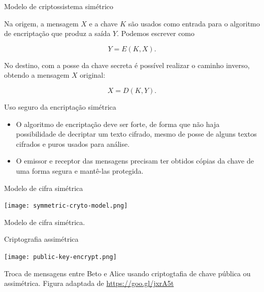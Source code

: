 \begin{frame}{Modelo de criptossistema simétrico}

Na origem, a mensagem $X$ e a chave $K$ são usados como entrada 
para o algoritmo de encriptação que produz a saída $Y$. Podemos 
escrever como

$$Y = E(K, X).$$

No destino, com a posse da chave secreta é possível realizar o caminho 
inverso, obtendo a mensagem $X$ original:

$$X = D(K ,Y).$$

\end{frame}


\begin{frame}{Uso seguro da encriptação simétrica}

\begin{itemize}
\item O algoritmo de encriptação deve ser forte, de forma que não haja
possibilidade de decriptar um texto cifrado, mesmo de posse de alguns
textos cifrados e puros usados para análise. 

\item O emissor e receptor das mensagens precisam ter obtidos cópias da
chave de uma forma segura e mantê-las protegida.
\end{itemize}

\end{frame}

\begin{frame}{Modelo de cifra simétrica}

\begin{center}
\texttt{[image: symmetric-cryto-model.png]}
\end{center}

\scriptsize
Modelo de cifra simétrica.

\end{frame}


 \begin{frame}{Criptografia assimétrica}

 \begin{center}
 \texttt{[image: public-key-encrypt.png]}
 \end{center}

 \scriptsize
 Troca de mensagens entre Beto e Alice usando criptogtafia de chave pública ou assimétrica. Figura adaptada de \url{https://goo.gl/jxrA5t}

 \end{frame}

